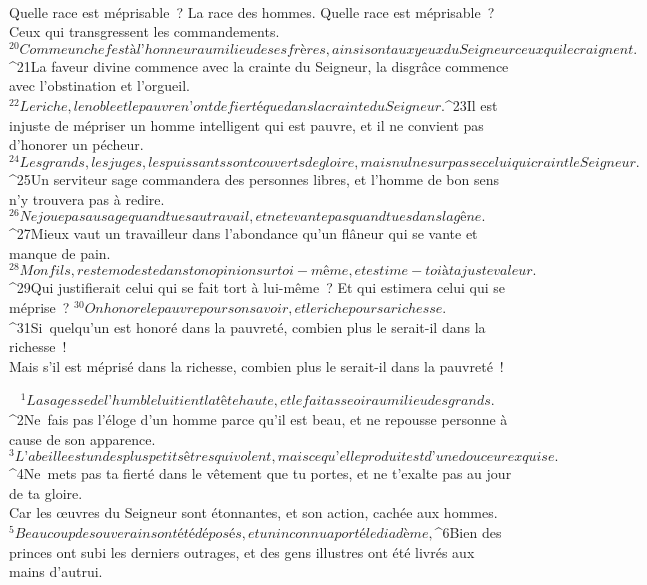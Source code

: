         \\Quelle race est méprisable ? La race des hommes.
        Quelle race est méprisable ? Ceux qui transgressent les commandements.
${}^{20}Comme un chef est à l’honneur au milieu de ses frères,
        ainsi sont aux yeux du Seigneur ceux qui le craignent.
${}^{21}La faveur divine commence avec la crainte du Seigneur,
        la disgrâce commence avec l’obstination et l’orgueil.
${}^{22}Le riche, le noble et le pauvre
        n’ont de fierté que dans la crainte du Seigneur.
${}^{23}Il est injuste de mépriser un homme intelligent qui est pauvre,
        et il ne convient pas d’honorer un pécheur.
${}^{24}Les grands, les juges, les puissants sont couverts de gloire,
        mais nul ne surpasse celui qui craint le Seigneur.
${}^{25}Un serviteur sage commandera des personnes libres,
        et l’homme de bon sens n’y trouvera pas à redire.
${}^{26}Ne joue pas au sage quand tu es au travail,
        et ne te vante pas quand tu es dans la gêne.
${}^{27}Mieux vaut un travailleur dans l’abondance
        qu’un flâneur qui se vante et manque de pain.
${}^{28}Mon fils, reste modeste dans ton opinion sur toi-même,
        et estime-toi à ta juste valeur.
${}^{29}Qui justifierait celui qui se fait tort à lui-même ?
        Et qui estimera celui qui se méprise ?
${}^{30}On honore le pauvre pour son savoir,
        et le riche pour sa richesse.
${}^{31}Si quelqu’un est honoré dans la pauvreté,
        combien plus le serait-il dans la richesse !
        \\Mais s’il est méprisé dans la richesse,
        combien plus le serait-il dans la pauvreté !
      
         
      \bchapter{}
${}^{1}La sagesse de l’humble lui tient la tête haute,
        et le fait asseoir au milieu des grands.
${}^{2}Ne fais pas l’éloge d’un homme parce qu’il est beau,
        et ne repousse personne à cause de son apparence.
${}^{3}L’abeille est un des plus petits êtres qui volent,
        mais ce qu’elle produit est d’une douceur exquise.
${}^{4}Ne mets pas ta fierté dans le vêtement que tu portes,
        et ne t’exalte pas au jour de ta gloire.
        \\Car les œuvres du Seigneur sont étonnantes,
        et son action, cachée aux hommes.
${}^{5}Beaucoup de souverains ont été déposés,
        et un inconnu a porté le diadème,
${}^{6}Bien des princes ont subi les derniers outrages,
        et des gens illustres ont été livrés aux mains d’autrui.
        
